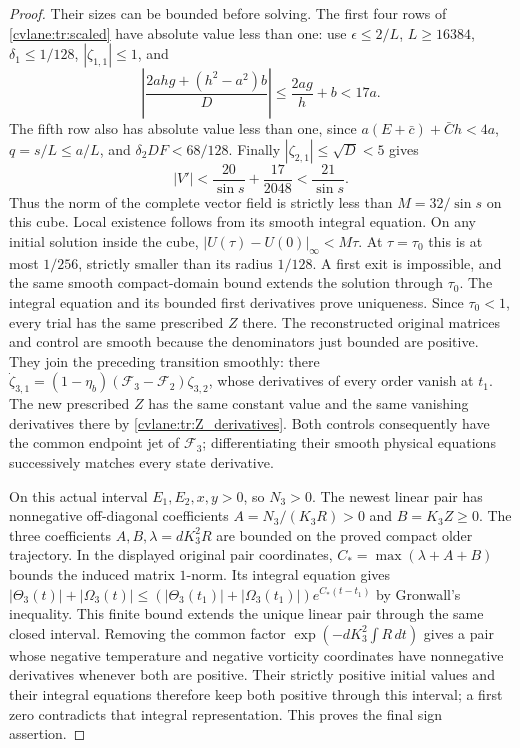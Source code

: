 \begin{proof}
Their sizes can be bounded before solving. The first four rows of
\eqref{cvlane:tr:scaled} have absolute value less than one: use
$\epsilon\leq2/L$, $L\geq16384$, $\delta_1\leq1/128$,
$|\zeta_{1,1}|\leq1$, and
\[
 \left|\frac{2ahg+(h^2-a^2)b}{D}\right|
 \leq\frac{2ag}{h}+b<17a.
\]
The fifth row also has absolute value less than one, since
$a(E+\bar c)+\bar Ch<4a$, $q=s/L\leq a/L$,
and $\delta_2DF<68/128$.
Finally $|\zeta_{2,1}|\leq\sqrt D<5$ gives
\[
 |V'|<\frac{20}{\sin s}+\frac{17}{2048}
       <\frac{21}{\sin s}.
\]
Thus the norm of the complete vector field is strictly less than
$M=32/\sin s$ on this cube. Local existence follows from its
smooth integral equation. On any initial solution inside the cube,
$|U(\tau)-U(0)|_\infty<M\tau$. At $\tau=\tau_0$
this is at most $1/256$, strictly smaller than its radius $1/128$.
A first exit is impossible, and the same smooth compact-domain
bound extends the solution through $\tau_0$. The integral
equation and its bounded first derivatives prove uniqueness.
Since $\tau_0<1$, every trial has the same prescribed $Z$ there.
The reconstructed original matrices and control are smooth because
the denominators just bounded are positive.
They join the preceding transition smoothly: there
$\dot\zeta_{3,1}=(1-\eta_b)(\mathcal F_3-\mathcal F_2)\zeta_{3,2}$,
whose derivatives of every order vanish at $t_1$. The new prescribed
$Z$ has the same constant value and the same vanishing derivatives
there by \eqref{cvlane:tr:Z_derivatives}. Both controls consequently have
the common endpoint jet of $\mathcal F_3$; differentiating their
smooth physical equations successively matches every state derivative.

On this actual interval $E_1,E_2,x,y>0$, so $N_3>0$.
The newest linear pair has nonnegative off-diagonal coefficients
$A=N_3/(K_3R)>0$ and $B=K_3Z\geq0$.
The three coefficients $A,B,\lambda=dK_3^2R$ are bounded on
the proved compact older trajectory. In the displayed original
pair coordinates, $C_*=\max(\lambda+A+B)$ bounds the induced
matrix $1$-norm. Its integral equation gives
$|\Theta_3(t)|+|\Omega_3(t)|\leq
(|\Theta_3(t_1)|+|\Omega_3(t_1)|)e^{C_*(t-t_1)}$
by Gronwall's inequality. This finite bound extends the unique
linear pair through the same closed interval.
Removing the common factor
$\exp(-dK_3^2\int R\,dt)$ gives a pair whose negative
temperature and negative vorticity coordinates have nonnegative
derivatives whenever both are positive. Their strictly positive
initial values and their integral equations therefore keep both
positive through this interval; a first zero contradicts that
integral representation. This proves the final sign assertion.
\end{proof}

